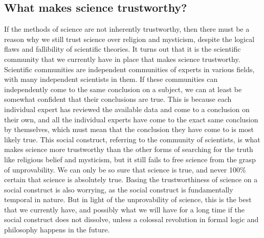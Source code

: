 \documentclass[11pt]{article}
\begin{document}
\newpage

\subsection{What makes science trustworthy?}
\label{sec:org0d7d811}
If the methods of science are not inherently trustworthy, then there must be a reason why we still trust science over religion and mysticism, despite the logical flaws and fallibility of scientific theories. It turns out that it is the scientific community that we currently have in place that makes science trustworthy. Scientific communities are independent communities of experts in various fields, with many independent scientists in them. If these communities can independently come to the same conclusion on a subject, we can at least be somewhat confident that their conclusions are true. This is because each individual expert has reviewed the available data and come to a conclusion on their own, and all the individual experts have come to the exact same conclusion by themselves, which must mean that the conclusion they have come to is most likely true. This social construct, referring to the community of scientists, is what makes science more trustworthy than the other forms of searching for the truth like religious belief and mysticism, but it still fails to free science from the grasp of unprovability. We can only be so sure that science is true, and never 100\% certain that science is absolutely true. Basing the trustworthiness of science on a social construct is also worrying, as the social construct is fundamentally temporal in nature. But in light of the unprovability of science, this is the best that we currently have, and possibly what we will have for a long time if the social construct does not dissolve, unless a colossal revolution in formal logic and philosophy happens in the future.

\newpage
\end{document}
